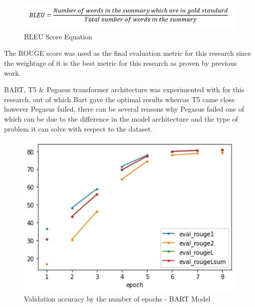 \documentclass[conference]{IEEEtran}
\begin{document}
\begin{figure}[htbp]
\centerline{\includegraphics[width=\linewidth]{images/bleu-score.jpg}}
\caption{BLEU Score Equation}
\label{fig:trait-content-output}
\end{figure}

The ROUGE score was used as the final evaluation metric for this research since the weightage of it is the best metric for this research as proven by previous work.

BART, T5 \& Pegasus transformer architecture was experimented with for this research, out of which Bart gave the optimal results whereas T5 came close however Pegasus failed, there can be several reasons why Pegasus failed one of which can be due to the difference in the model architecture and the type of problem it can solve with respect to the dataset. 

\begin{figure}[htbp]
\centerline{\includegraphics[width=\linewidth]{images/bart-model-validation-accuracy.jpg}}
\caption{Validation accuracy by the number of epochs - BART Model}
\label{fig:trait-content-output}
\end{figure}
\end{document}
